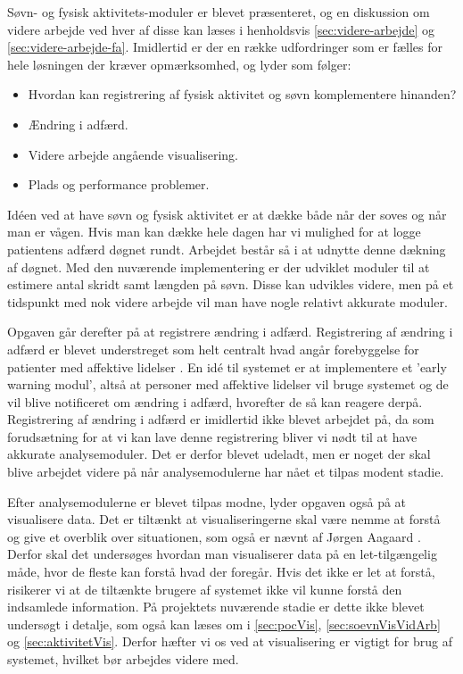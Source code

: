 Søvn- og fysisk aktivitets-moduler er blevet præsenteret, og en diskussion om videre arbejde ved hver af disse kan læses i henholdsvis \cref{sec:videre-arbejde} og \cref{sec:videre-arbejde-fa}.
Imidlertid er der en række udfordringer som er fælles for hele løsningen der kræver opmærksomhed, og lyder som følger:
\begin{itemize}
	\item Hvordan kan registrering af fysisk aktivitet og søvn komplementere hinanden?
	\item Ændring i adfærd.
	\item Videre arbejde angående visualisering.
	\item Plads og performance problemer.
\end{itemize}

Idéen ved at have søvn og fysisk aktivitet er at dække både når der soves og når man er vågen.
Hvis man kan dække hele dagen har vi mulighed for at logge patientens adfærd døgnet rundt.
Arbejdet består så i at udnytte denne dækning af døgnet.
Med den nuværende implementering er der udviklet moduler til at estimere antal skridt samt længden på søvn.
Disse kan udvikles videre, men på et tidspunkt med nok videre arbejde vil man have nogle relativt akkurate moduler.

Opgaven går derefter på at registrere ændring i adfærd. 
Registrering af ændring i adfærd er blevet understreget som helt centralt hvad angår forebyggelse for patienter med affektive lidelser \citep[1.4, Møde med Psykiatri professor Jørgen Aagaard]{misc:faellesrapp}.
En idé til systemet er at implementere et 'early warning modul', altså at personer med affektive lidelser vil bruge systemet og de vil blive notificeret om ændring i adfærd, hvorefter de så kan reagere derpå. 
Registrering af ændring i adfærd er imidlertid ikke blevet arbejdet på, da som forudsætning for at vi kan lave denne registrering bliver vi nødt til at have akkurate analysemoduler.
Det er derfor blevet udeladt, men er noget der skal blive arbejdet videre på når analysemodulerne har nået et tilpas modent stadie.

Efter analysemodulerne er blevet tilpas modne, lyder opgaven også på at visualisere data.
Det er tiltænkt at visualiseringerne skal være nemme at forstå og give et overblik over situationen, som også er nævnt af Jørgen Aagaard \citep[1.4, Møde med Psykiatri professor Jørgen Aagaard]{misc:faellesrapp}. 
Derfor skal det undersøges hvordan man visualiserer data på en let-tilgængelig måde, hvor de fleste kan forstå hvad der foregår. 
Hvis det ikke er let at forstå, risikerer vi at de tiltænkte brugere af systemet ikke vil kunne forstå den indsamlede information.
På projektets nuværende stadie er dette ikke blevet undersøgt i detalje, som også kan læses om i \cref{sec:pocVis}, \cref{sec:soevnVisVidArb} og \cref{sec:aktivitetVis}. 
Derfor hæfter vi os ved at visualisering er vigtigt for brug af systemet, hvilket bør arbejdes videre med.

